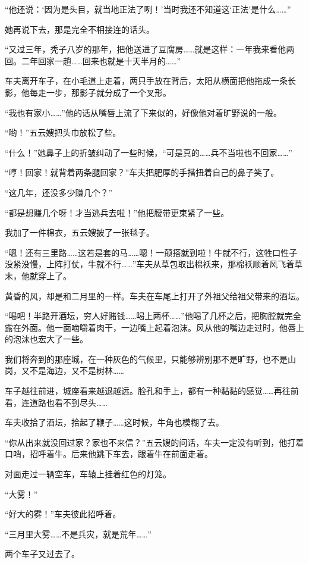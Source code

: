 \par “他还说：‘因为是头目，就当地正法了咧！’当时我还不知道这‘正法’是什么……”
\par 她再说下去，那是完全不相接连的话头。
\par “又过三年，秃子八岁的那年，把他送进了豆腐房……就是这样：一年我来看他两回。二年回家一趟……回来也就是十天半月的……”
\par 车夫离开车子，在小毛道上走着，两只手放在背后，太阳从横面把他拖成一条长影，他每走一步，那影子就分成了一个叉形。
\par “我也有家小……”他的话从嘴唇上流了下来似的，好像他对着旷野说的一般。
\par “哟！”五云嫂把头巾放松了些。
\par “什么！”她鼻子上的折皱纠动了一些时候，“可是真的……兵不当啦也不回家……”
\par “哼！回家！就背着两条腿回家？”车夫把肥厚的手揩扭着自己的鼻子笑了。
\par “这几年，还没多少赚几个？”
\par “都是想赚几个呀！才当逃兵去啦！”他把腰带更束紧了一些。
\par 我加了一件棉衣，五云嫂披了一张毯子。
\par “嗯！还有三里路……这若是套的马……嗯！一颠搭就到啦！牛就不行，这牲口性子没紧没慢，上阵打仗，牛就不行……”车夫从草包取出棉袄来，那棉袄顺着风飞着草末，他就穿上了。
\par 黄昏的风，却是和二月里的一样。车夫在车尾上打开了外祖父给祖父带来的酒坛。
\par “喝吧！半路开酒坛，穷人好赌钱……喝上两杯……”他喝了几杯之后，把胸膛就完全露在外面。他一面啮嚼着肉干，一边嘴上起着泡沫。风从他的嘴边走过时，他唇上的泡沫也宏大了一些。
\par 我们将奔到的那座城，在一种灰色的气候里，只能够辨别那不是旷野，也不是山岗，又不是海边，又不是树林……
\par 车子越往前进，城座看来越退越远。脸孔和手上，都有一种黏黏的感觉……再往前看，连道路也看不到尽头……
\par 车夫收拾了酒坛，拾起了鞭子……这时候，牛角也模糊了去。
\par “你从出来就没回过家？家也不来信？”五云嫂的问话，车夫一定没有听到，他打着口哨，招呼着牛。后来他跳下车去，跟着牛在前面走着。
\par 对面走过一辆空车，车辕上挂着红色的灯笼。
\par “大雾！”
\par “好大的雾！”车夫彼此招呼着。
\par “三月里大雾……不是兵灾，就是荒年……”
\par 两个车子又过去了。
\par {}



